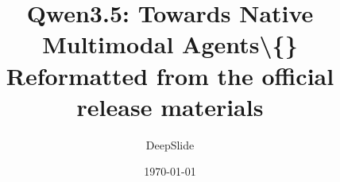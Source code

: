 \title{Qwen3.5: Towards Native Multimodal Agents\textbackslash\{\} Reformatted from the official release materials}
\author{DeepSlide}
\date{\today}